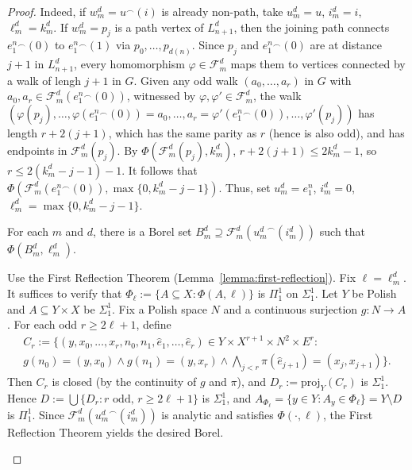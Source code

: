 \begin{proof}
    Indeed, if $w^d_m=u^\smallfrown(i)$ is already non-path, take $u^d_m=u$, $i^d_m=i$, $\ell^d_m=k^d_m$.
    If $w^d_m=p_j$ is a path vertex of $L^d_{n+1}$, then the joining path connects $e_1^n{}^\smallfrown(0)$ to $e_1^n{}^\smallfrown(1)$ via $p_0,\dots,p_{d(n)}$.
    Since $p_j$ and $e_1^n{}^\smallfrown(0)$ are at distance $j+1$ in $L^d_{n+1}$, every homomorphism $\varphi\in\mathcal F^d_m$ maps them to vertices connected by a walk of lengh $j+1$ in $G$.
    Given any odd walk $(a_0,\dots,a_r)$ in $G$ with $a_0,a_r\in\mathcal F^d_m(e_1^n{}^\smallfrown(0))$, witnessed by $\varphi,\varphi'\in\mathcal F^d_m$, the walk $(\varphi(p_j),\dots,\varphi(e_1^n{}^\smallfrown(0))=a_0,\dots,a_r=\varphi'(e_1^n{}^\smallfrown(0)),\dots,\varphi'(p_j))$ has length $r+2(j+1)$, which has the same parity as $r$ (hence is also odd), and has endpoints in $\mathcal F^d_m(p_j)$.
    By $\Phi(\mathcal F^d_m(p_j),k^d_m)$, $r+2(j+1)\leq 2k^d_m-1$, so $r\leq 2(k^d_m-j-1)-1$.
    It follows that $\Phi(\mathcal F^d_m(e_1^n{}^\smallfrown(0)),\max\{0,k^d_m-j-1\})$.
    Thus, set $u^d_m=e_1^n$, $i^d_m=0$, $\ell^d_m=\max\{0,k^d_m-j-1\}$.
    
    \begin{claim}\label{claim:separation_odd-walks}
        For each $m$ and $d$, there is a Borel set $B^d_m\supseteq\mathcal F^d_m({u^d_m}^\smallfrown(i^d_m))$ such that $\Phi(B^d_m,\ell^d_m)$.
    \end{claim}

    \begin{claimproof}
        Use the First Reflection Theorem (Lemma~\ref{lemma:first-reflection}).
        Fix $\ell=\ell^d_m$.
        It suffices to verify that $\Phi_\ell:=\{A\subseteq X:\Phi(A,\ell)\}$ is $\Pi^1_1$ on $\Sigma^1_1$.
        Let $Y$ be Polish and $A\subseteq Y\times X$ be $\Sigma^1_1$.
        Fix a Polish space $N$ and a continuous surjection $g\colon N\to A$.
        For each odd $r\geq 2\ell+1$, define
        \begin{align*}
            C_r:=\{(y,x_0,\dots,x_r,n_0,n_1,\hat e_1,\dots,\hat e_r)\in Y\times X^{r+1}\times N^2\times E^r:{}\\
            g(n_0)=(y,x_0)\land g(n_1)=(y,x_r)\land\textstyle\bigwedge_{j<r}\pi(\hat e_{j+1})=(x_j,x_{j+1})\}.
        \end{align*}
        Then $C_r$ is closed (by the continuity of $g$ and $\pi$), and $D_r:=\mathrm{proj}_Y(C_r)$ is $\Sigma^1_1$.
        Hence $D:=\bigcup\{D_r:r\text{ odd},\,r\geq 2\ell+1\}$ is $\Sigma^1_1$, and $A_{\Phi_\ell}=\{y\in Y:A_y\in\Phi_\ell\}=Y\setminus D$
        is $\Pi^1_1$.
        Since $\mathcal F^d_m({u^d_m}^\smallfrown(i^d_m))$ is analytic and satisfies $\Phi(\cdot,\ell)$, the First Reflection Theorem yields the desired Borel.
    \end{claimproof}


\end{proof}
